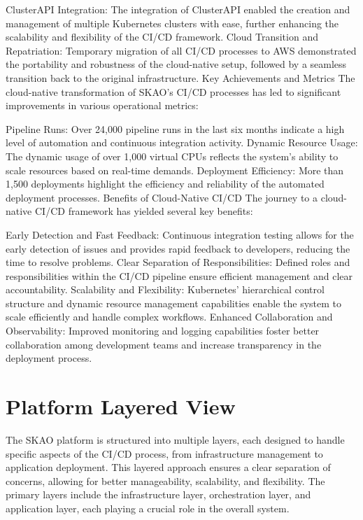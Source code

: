 \documentclass[a4paper]{spie}  %
\begin{document}
ClusterAPI Integration: The integration of ClusterAPI enabled the creation and management of multiple Kubernetes clusters with ease, further enhancing the scalability and flexibility of the CI/CD framework.
Cloud Transition and Repatriation: Temporary migration of all CI/CD processes to AWS demonstrated the portability and robustness of the cloud-native setup, followed by a seamless transition back to the original infrastructure.
Key Achievements and Metrics
The cloud-native transformation of SKAO's CI/CD processes has led to significant improvements in various operational metrics:

Pipeline Runs: Over 24,000 pipeline runs in the last six months indicate a high level of automation and continuous integration activity.
Dynamic Resource Usage: The dynamic usage of over 1,000 virtual CPUs reflects the system's ability to scale resources based on real-time demands.
Deployment Efficiency: More than 1,500 deployments highlight the efficiency and reliability of the automated deployment processes.
Benefits of Cloud-Native CI/CD
The journey to a cloud-native CI/CD framework has yielded several key benefits:

Early Detection and Fast Feedback: Continuous integration testing allows for the early detection of issues and provides rapid feedback to developers, reducing the time to resolve problems.
Clear Separation of Responsibilities: Defined roles and responsibilities within the CI/CD pipeline ensure efficient management and clear accountability.
Scalability and Flexibility: Kubernetes' hierarchical control structure and dynamic resource management capabilities enable the system to scale efficiently and handle complex workflows.
Enhanced Collaboration and Observability: Improved monitoring and logging capabilities foster better collaboration among development teams and increase transparency in the deployment process.

\section{Platform Layered View}

The SKAO platform is structured into multiple layers, each designed to handle specific aspects of the CI/CD process, from infrastructure management to application deployment. This layered approach ensures a clear separation of concerns, allowing for better manageability, scalability, and flexibility. The primary layers include the infrastructure layer, orchestration layer, and application layer, each playing a crucial role in the overall system.
\end{document}
